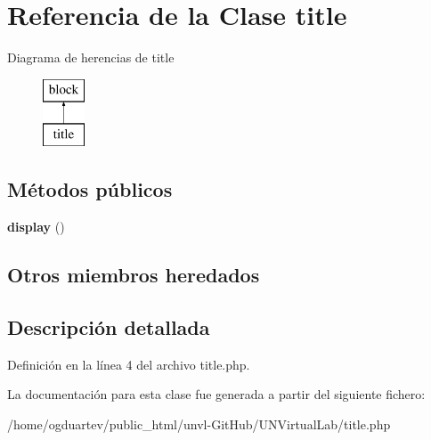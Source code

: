 \hypertarget{classtitle}{}\section{Referencia de la Clase title}
\label{classtitle}
Diagrama de herencias de title\begin{figure}[H]
\begin{center}
\leavevmode
\includegraphics[height=2.000000cm]{classtitle}
\end{center}
\end{figure}
\subsection*{Métodos públicos}
\begin{DoxyCompactItemize}
\item 
\mbox{\label{classtitle_a0b55e34d6485e20a3dfd4a6efd341ed8}} 
{\bfseries display} ()
\end{DoxyCompactItemize}
\subsection*{Otros miembros heredados}


\subsection{Descripción detallada}


Definición en la línea 4 del archivo title.\+php.



La documentación para esta clase fue generada a partir del siguiente fichero\+:\begin{DoxyCompactItemize}
\item 
/home/ogduartev/public\+\_\+html/unvl-\/\+Git\+Hub/\+U\+N\+Virtual\+Lab/title.\+php\end{DoxyCompactItemize}
